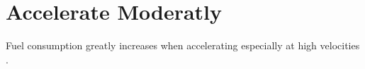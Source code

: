 \section{Accelerate Moderatly}

Fuel consumption greatly increases when accelerating especially at high velocities \cite{EcoMark}.
